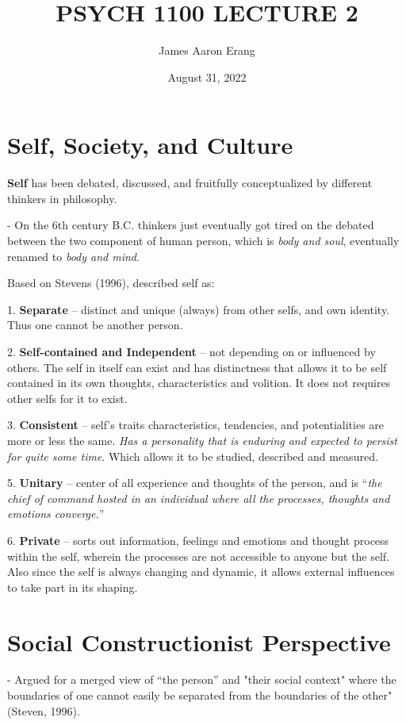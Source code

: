 \documentclass[12pt, UTF8]{article}
\title{PSYCH 1100 LECTURE 2}
\author{James Aaron Erang}
\date{August 31, 2022}
\begin{document}
	\maketitle
	
	\section*{Self, Society, and Culture}
	
	\textbf{Self} has been debated, discussed, and fruitfully conceptualized by different thinkers in philosophy.
	
	- On the 6th century B.C. thinkers just eventually got tired on the debated between the two component of human person, which is \textit{body and soul}, eventually renamed to \textit{body and mind}.
	
	Based on Stevens (1996), described self as:
	
	1. \textbf{Separate} -- distinct and unique (always) from other selfs, and own identity. Thus one cannot be another person.
	
	2. \textbf{Self-contained and Independent} -- not depending on or influenced by others. The self in itself can exist and has distinctness that allows it to be self contained in its own thoughts, characteristics and volition. It does not requires other selfs for it to exist.
	
	3. \textbf{Consistent} -- self's traits characteristics, tendencies, and potentialities are more or less the same. \textit{Has a personality that is enduring and expected to persist for quite some time}. Which allows it to be studied, described and measured.
	
	5. \textbf{Unitary} -- center of all experience and thoughts of the person, and is ``\textit{the chief of command hosted in an individual where all the processes, thoughts and emotions converge.}''
	
	6. \textbf{Private} -- sorts out information, feelings and emotions and thought process within the self, wherein the processes are not accessible to anyone but the self. Also since the self is always changing and dynamic, it allows external influences to take part in its shaping.
	
	\section{Social Constructionist Perspective}
	
	- Argued for a merged view of ``the person'' and "their social context" where the boundaries of one cannot easily be separated from the boundaries of the other" (Steven, 1996).
	
\end{document}
